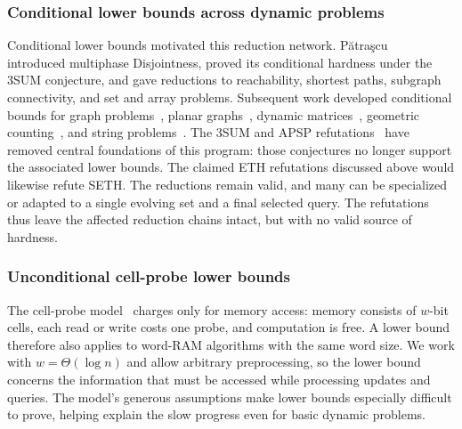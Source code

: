 \documentclass[11pt]{article}
\theoremstyle{plain}
\theoremstyle{definition}
\theoremstyle{remark}
\newcommand{\Patrascu}{P\u{a}tra\c{s}cu\xspace}
\begin{document}
\subsubsection{Conditional lower bounds across dynamic problems}

Conditional lower bounds motivated this reduction network. \Patrascu~\cite{patrascu_mihai_towards_2010} introduced multiphase Disjointness, proved its conditional hardness under the 3SUM conjecture, and gave reductions to reachability, shortest paths, subgraph connectivity, and set and array problems. Subsequent work developed conditional bounds for graph problems~\cite{abboud_popular_2014,henzinger_unifying_2015}, planar graphs~\cite{abboud_popular_2016}, dynamic matrices~\cite{van_den_brand_dynamic_2019}, geometric counting~\cite{dallant_conditional_2022,jin_tight_2022}, and string problems~\cite{clifford_upper_2018,charalampopoulos_internal_2019}. The 3SUM and APSP refutations~\cite{alman_truly_2026} have removed central foundations of this program: those conjectures no longer support the associated lower bounds. The claimed ETH refutations discussed above would likewise refute SETH. The reductions remain valid, and many can be specialized or adapted to a single evolving set and a final selected query. The refutations thus leave the affected reduction chains intact, but with no valid source of hardness.

\subsubsection{Unconditional cell-probe lower bounds}
The cell-probe model~\cite{yao_should_1981} charges only for memory access: memory consists of $w$-bit cells, each read or write costs one probe, and computation is free. A lower bound therefore also applies to word-RAM algorithms with the same word size. We work with $w=\Theta(\log n)$ and allow arbitrary preprocessing, so the lower bound concerns the information that must be accessed while processing updates and queries. The model's generous assumptions make lower bounds especially difficult to prove, helping explain the slow progress even for basic dynamic problems.
\end{document}
